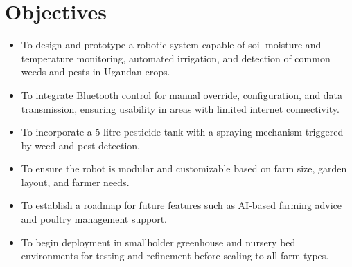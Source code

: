 \documentclass[12pt,a4paper]{report}
\begin{document}
\section{Objectives}
\begin{itemize}
    \item To design and prototype a robotic system capable of soil moisture and temperature monitoring, automated irrigation, and detection of common weeds and pests in Ugandan crops.
    \item To integrate Bluetooth control for manual override, configuration, and data transmission, ensuring usability in areas with limited internet connectivity.\\
    \item To incorporate a 5-litre pesticide tank with a spraying mechanism triggered by weed and pest detection.
    \item To ensure the robot is modular and customizable based on farm size, garden layout, and farmer needs.
    \item To establish a roadmap for future features such as AI-based farming advice and poultry management support.
    \item To begin deployment in smallholder greenhouse and nursery bed environments for testing and refinement before scaling to all farm types.
\end{itemize}
\end{document}
